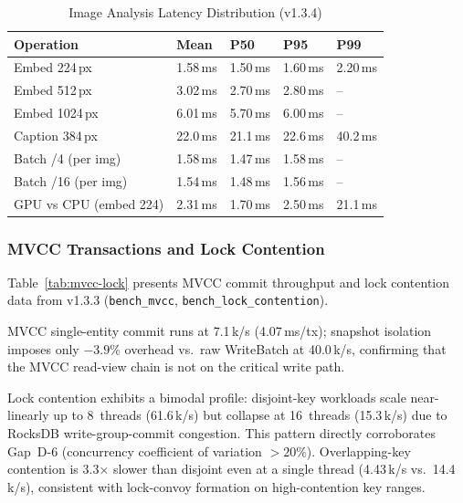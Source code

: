 \documentclass[conference]{IEEEtran}
\begin{document}
\begin{table}[t]
  \caption{Image Analysis Latency Distribution (v1.3.4)}
  \label{tab:img-latency}
  \centering
  \begin{tabular}{L{3.2cm}R{1.1cm}R{1.0cm}R{1.0cm}R{1.0cm}}
    \toprule
    \textbf{Operation} & \textbf{Mean} & \textbf{P50} &
    \textbf{P95} & \textbf{P99} \\
    \midrule
    Embed 224\,px           & 1.58\,ms & 1.50\,ms & 1.60\,ms & 2.20\,ms \\
    Embed 512\,px           & 3.02\,ms & 2.70\,ms & 2.80\,ms & -- \\
    Embed 1024\,px          & 6.01\,ms & 5.70\,ms & 6.00\,ms & -- \\
    Caption 384\,px         & 22.0\,ms & 21.1\,ms & 22.6\,ms & 40.2\,ms \\
    Batch /4 (per img)      & 1.58\,ms & 1.47\,ms & 1.58\,ms & -- \\
    Batch /16 (per img)     & 1.54\,ms & 1.48\,ms & 1.56\,ms & -- \\
    GPU vs CPU (embed 224)  & 2.31\,ms & 1.70\,ms & 2.50\,ms & 21.1\,ms \\
    \bottomrule
  \end{tabular}
\end{table}

\subsubsection{MVCC Transactions and Lock Contention}
\label{sssec:mvcc-lock}

Table~\ref{tab:mvcc-lock} presents MVCC commit throughput and lock
contention data from v1.3.3
(\texttt{bench\_mvcc}, \texttt{bench\_lock\_contention}).

MVCC single-entity commit runs at 7.1\,k/s (4.07\,ms/tx); snapshot
isolation imposes only $-3.9\%$ overhead vs.\ raw WriteBatch at
40.0\,k/s, confirming that the MVCC read-view chain is not on the
critical write path.

Lock contention exhibits a bimodal profile: disjoint-key workloads
scale near-linearly up to 8~threads (61.6\,k/s) but collapse at
16~threads (15.3\,k/s) due to RocksDB write-group-commit
congestion.
This pattern directly corroborates Gap~D-6 (concurrency coefficient
of variation $> 20\%$).
Overlapping-key contention is 3.3$\times$ slower than disjoint
even at a single thread (4.43\,k/s vs.\ 14.4\,k/s), consistent with
lock-convoy formation on high-contention key ranges.
\end{document}
